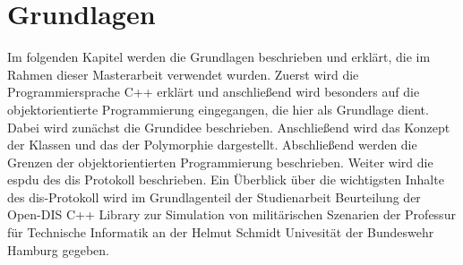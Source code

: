 \chapter{Grundlagen}\label{grundlagen}

Im folgenden Kapitel werden die Grundlagen beschrieben und erklärt, die im Rahmen dieser Masterarbeit verwendet wurden. Zuerst wird die Programmiersprache C++ erklärt und anschließend wird besonders auf die objektorientierte Programmierung eingegangen, die hier als Grundlage dient. Dabei wird zunächst die Grundidee beschrieben. Anschließend wird das Konzept der Klassen und das der Polymorphie dargestellt. Abschließend werden die Grenzen der objektorientierten Programmierung beschrieben.  Weiter wird  die \ac{espdu} des \ac{dis} Protokoll beschrieben. Ein Überblick über die wichtigsten Inhalte des \ac{dis}-Protokoll wird im Grundlagenteil der Studienarbeit \glqq Beurteilung der Open-DIS C++ Library zur Simulation von militärischen Szenarien\grqq{} der Professur für Technische Informatik an der Helmut Schmidt Univesität der Bundeswehr Hamburg gegeben.


